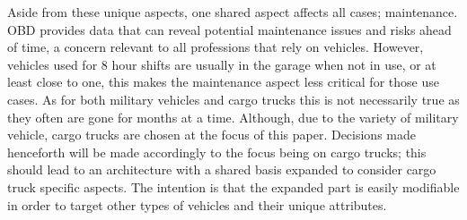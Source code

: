\bigskip \noindent
Aside from these unique aspects, one shared aspect affects all cases; maintenance.
\ac{OBD} provides data that can reveal potential maintenance issues and risks ahead of time, a concern relevant to all professions that rely on vehicles.
However, vehicles used for 8 hour shifts are usually in the garage when not in use, or at least close to one, this makes the maintenance aspect less critical for those use cases.
As for both military vehicles and cargo trucks this is not necessarily true as they often are gone for months at a time.
Although, due to the variety of military vehicle, cargo trucks are chosen at the focus of this paper.
Decisions made henceforth will be made accordingly to the focus being on cargo trucks; this should lead to an architecture with a shared basis expanded to consider cargo truck specific aspects.
The intention is that the expanded part is easily modifiable in order to target other types of vehicles and their unique attributes.
